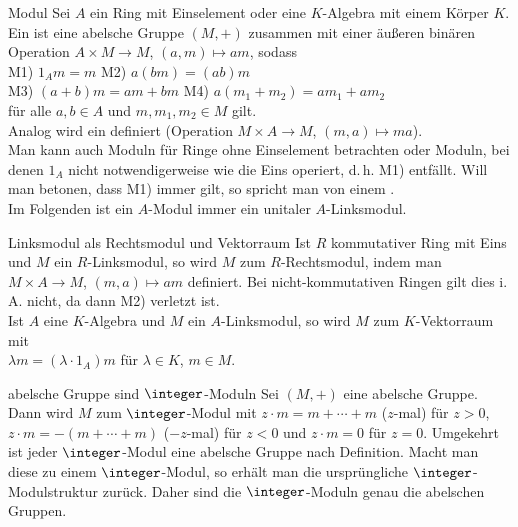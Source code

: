 \begin{Def}{Modul}
    Sei $A$ ein Ring mit Einselement oder eine $K$-Algebra mit einem Körper
    $K$.
    Ein  ist eine abelsche Gruppe $(M, +)$ zusammen mit
    einer äußeren binären Operation $A \times M \rightarrow M$,
    $(a, m) \mapsto am$, sodass \\
    M1) $1_A m = m$ \qquad\qquad\qquad\;\;
    M2) $a(bm) = (ab)m$ \\
    M3) $(a + b)m = am + bm$ \qquad
    M4) $a(m_1 + m_2) = am_1 + am_2$ \\
    für alle $a, b \in A$ und $m, m_1, m_2 \in M$ gilt. \\
    Analog wird ein  definiert
    (Operation $M \times A \rightarrow M$, $(m, a) \mapsto ma$). \\
    Man kann auch Moduln für Ringe ohne Einselement betrachten oder
    Moduln, bei denen $1_A$ nicht notwendigerweise wie die Eins operiert,
    d.\,h. M1) entfällt.
    Will man betonen, dass M1) immer gilt, so spricht man von
    einem . \\
    Im Folgenden ist ein $A$-Modul immer ein unitaler $A$-Linksmodul.
\end{Def}

\begin{Satz}{Linksmodul als Rechtsmodul und Vektorraum}
    Ist $R$ kommutativer Ring mit Eins und $M$ ein $R$-Linksmodul,
    so wird $M$ zum $R$-Rechtsmodul, indem man $M \times A \rightarrow M$,
    $(m, a) \mapsto am$ definiert.
    Bei nicht-kommutativen Ringen gilt dies i.\,A. nicht, da 
    dann M2) verletzt ist. \\
    Ist $A$ eine $K$-Algebra und $M$ ein $A$-Linksmodul,
    so wird $M$ zum $K$-Vektorraum mit \\
    $\lambda m = (\lambda \cdot 1_A) m$ für $\lambda \in K$, $m \in M$.
\end{Satz}

\begin{Satz}{abelsche Gruppe sind $\integer$-Moduln}
    Sei $(M, +)$ eine abelsche Gruppe. \\
    Dann wird $M$ zum $\integer$-Modul mit
    $z \cdot m = m + \dotsb + m$ ($z$-mal) für $z > 0$,
    $z \cdot m = -(m + \dotsb + m)$ ($-z$-mal) für $z < 0$
    und $z \cdot m = 0$ für $z = 0$.
    Umgekehrt ist jeder $\integer$-Modul eine abelsche Gruppe nach Definition.
    Macht man diese zu einem $\integer$-Modul, so erhält man die
    ursprüngliche $\integer$-Modulstruktur zurück.
    Daher sind die $\integer$-Moduln genau die abelschen Gruppen.
\end{Satz}

